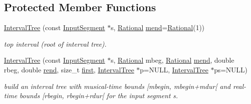 \subsection*{Protected Member Functions}
\begin{DoxyCompactItemize}
\item 
\mbox{\hyperlink{group__segment_gab092e4338aa4c3369c4fa4404d8706b0}{Interval\+Tree}} (const \mbox{\hyperlink{classInputSegment}{Input\+Segment}} $\ast$s, \mbox{\hyperlink{classRational}{Rational}} \mbox{\hyperlink{classInterval_a963b9b36f085a7db9c159c55608f8408}{mend}}=\mbox{\hyperlink{classRational}{Rational}}(1))
\begin{DoxyCompactList}\small\item\em top interval (root of interval tree). \end{DoxyCompactList}\item 
\mbox{\hyperlink{group__segment_gac16f2a8d9c584a869bbed6a263914360}{Interval\+Tree}} (const \mbox{\hyperlink{classInputSegment}{Input\+Segment}} $\ast$s, \mbox{\hyperlink{classRational}{Rational}} mbeg, \mbox{\hyperlink{classRational}{Rational}} \mbox{\hyperlink{classInterval_a963b9b36f085a7db9c159c55608f8408}{mend}}, double rbeg, double \mbox{\hyperlink{classInterval_a1acb3128311a318b23e68cc8ca0182e9}{rend}}, size\+\_\+t \mbox{\hyperlink{classAlignedInterval_a1660736ae6e829e6c92616e49784a583}{first}}, \mbox{\hyperlink{classIntervalTree}{Interval\+Tree}} $\ast$p=N\+U\+LL, \mbox{\hyperlink{classIntervalTree}{Interval\+Tree}} $\ast$ps=N\+U\+LL)
\begin{DoxyCompactList}\small\item\em build an interval tree with musical-\/time bounds \mbox{[}mbegin, mbegin+mdur\mbox{[} and real-\/time bounds \mbox{[}rbegin, rbegin+rdur\mbox{[} for the input segment s. \end{DoxyCompactList}\end{DoxyCompactItemize}
